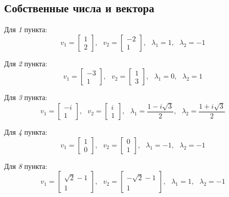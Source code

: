 \documentclass[a4paper,hidelinks,14pt]{extarticle}
\begin{document}
	\subsection{Собственные числа и вектора}
	Для \textit{1} пункта:
	$$
	v_1=\begin{bmatrix}
		1 \\ 2
	\end{bmatrix}, \text{ }
	v_2 = \begin{bmatrix}
		-2 \\ 1
	\end{bmatrix}, \text{ }
	\lambda_1 = 1, \text{ }
	\lambda_2 = -1
	$$
	
	Для \textit{2} пункта:
	$$
	v_1=\begin{bmatrix}
		-3 \\ 1
	\end{bmatrix}, \text{ }
	v_2 = \begin{bmatrix}
		1 \\ 3
	\end{bmatrix}, \text{ }
	\lambda_1 = 0, \text{ }
	\lambda_2 = 1
	$$
	
	Для \textit{3} пункта:
	$$
	v_1=\begin{bmatrix}
		-i \\ 1
	\end{bmatrix}, \text{ }
	v_2 = \begin{bmatrix}
		i \\ 1
	\end{bmatrix}, \text{ }
	\lambda_1 = \frac{1-i\sqrt{3}}{2}, \text{ }
	\lambda_2 = \frac{1+i\sqrt{3}}{2}
	$$
	
	Для \textit{4} пункта:
	$$
	v_1=\begin{bmatrix}
		1 \\ 0
	\end{bmatrix}, \text{ }
	v_2 = \begin{bmatrix}
		0 \\ 1
	\end{bmatrix}, \text{ }
	\lambda_1 = -1, \text{ }
	\lambda_2 = -1
	$$
	
	Для \textit{8} пункта:
	$$
	v_1=\begin{bmatrix}
		\sqrt{2} - 1 \\ 1
	\end{bmatrix}, \text{ }
	v_2 = \begin{bmatrix}
		-\sqrt{2} - 1 \\ 1
	\end{bmatrix}, \text{ }
	\lambda_1 = 1, \text{ }
	\lambda_2 = -1
	$$
	
\end{document}
